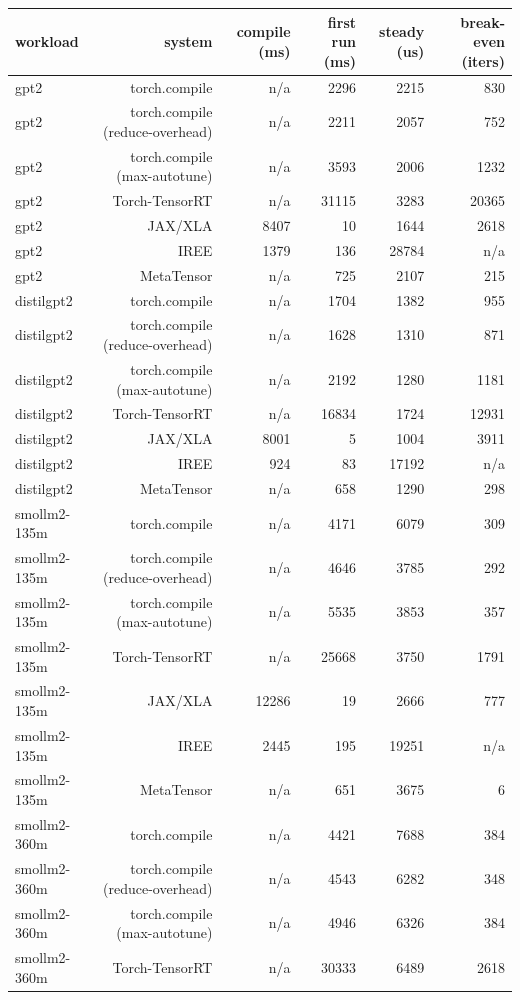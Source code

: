 \begin{tabular}{lrrrrr}
\toprule
workload & system & compile (ms) & first run (ms) & steady (us) & break-even (iters) \\
\midrule
gpt2 & torch.compile & n/a & 2296 & 2215 & 830 \\
gpt2 & torch.compile (reduce-overhead) & n/a & 2211 & 2057 & 752 \\
gpt2 & torch.compile (max-autotune) & n/a & 3593 & 2006 & 1232 \\
gpt2 & Torch-TensorRT & n/a & 31115 & 3283 & 20365 \\
gpt2 & JAX/XLA & 8407 & 10 & 1644 & 2618 \\
gpt2 & IREE & 1379 & 136 & 28784 & n/a \\
gpt2 & MetaTensor & n/a & 725 & 2107 & 215 \\
distilgpt2 & torch.compile & n/a & 1704 & 1382 & 955 \\
distilgpt2 & torch.compile (reduce-overhead) & n/a & 1628 & 1310 & 871 \\
distilgpt2 & torch.compile (max-autotune) & n/a & 2192 & 1280 & 1181 \\
distilgpt2 & Torch-TensorRT & n/a & 16834 & 1724 & 12931 \\
distilgpt2 & JAX/XLA & 8001 & 5 & 1004 & 3911 \\
distilgpt2 & IREE & 924 & 83 & 17192 & n/a \\
distilgpt2 & MetaTensor & n/a & 658 & 1290 & 298 \\
smollm2-135m & torch.compile & n/a & 4171 & 6079 & 309 \\
smollm2-135m & torch.compile (reduce-overhead) & n/a & 4646 & 3785 & 292 \\
smollm2-135m & torch.compile (max-autotune) & n/a & 5535 & 3853 & 357 \\
smollm2-135m & Torch-TensorRT & n/a & 25668 & 3750 & 1791 \\
smollm2-135m & JAX/XLA & 12286 & 19 & 2666 & 777 \\
smollm2-135m & IREE & 2445 & 195 & 19251 & n/a \\
smollm2-135m & MetaTensor & n/a & 651 & 3675 & 6 \\
smollm2-360m & torch.compile & n/a & 4421 & 7688 & 384 \\
smollm2-360m & torch.compile (reduce-overhead) & n/a & 4543 & 6282 & 348 \\
smollm2-360m & torch.compile (max-autotune) & n/a & 4946 & 6326 & 384 \\
smollm2-360m & Torch-TensorRT & n/a & 30333 & 6489 & 2618 \\

\end{tabular}
